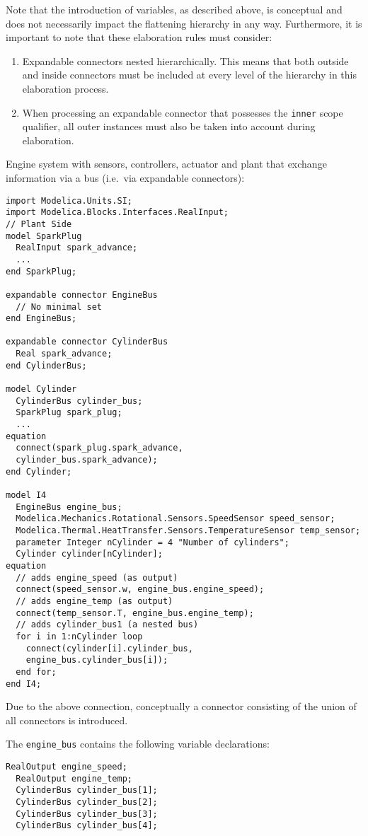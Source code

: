 \begin{nonnormative}
Note that the introduction of variables, as described above, is
conceptual and does not necessarily impact the flattening hierarchy in
any way. Furthermore, it is important to note that these elaboration
rules must consider:
\begin{enumerate}
\item Expandable connectors nested hierarchically. This means that
both outside and inside connectors must be included at every level of
the hierarchy in this elaboration process.
\item When processing an expandable connector that possesses the
\lstinline!inner! scope qualifier, all outer instances must also be taken into
account during elaboration.
\end{enumerate}
\end{nonnormative}

\begin{example}
Engine system with sensors, controllers, actuator and plant that
exchange information via a bus (i.e.\ via expandable connectors):
\begin{lstlisting}[language=modelica]
import Modelica.Units.SI;
import Modelica.Blocks.Interfaces.RealInput;
// Plant Side
model SparkPlug
  RealInput spark_advance;
  ...
end SparkPlug;

expandable connector EngineBus
  // No minimal set
end EngineBus;

expandable connector CylinderBus
  Real spark_advance;
end CylinderBus;

model Cylinder
  CylinderBus cylinder_bus;
  SparkPlug spark_plug;
  ...
equation
  connect(spark_plug.spark_advance,
  cylinder_bus.spark_advance);
end Cylinder;

model I4
  EngineBus engine_bus;
  Modelica.Mechanics.Rotational.Sensors.SpeedSensor speed_sensor;
  Modelica.Thermal.HeatTransfer.Sensors.TemperatureSensor temp_sensor;
  parameter Integer nCylinder = 4 "Number of cylinders";
  Cylinder cylinder[nCylinder];
equation
  // adds engine_speed (as output)
  connect(speed_sensor.w, engine_bus.engine_speed);
  // adds engine_temp (as output)
  connect(temp_sensor.T, engine_bus.engine_temp);
  // adds cylinder_bus1 (a nested bus)
  for i in 1:nCylinder loop
    connect(cylinder[i].cylinder_bus,
    engine_bus.cylinder_bus[i]);
  end for;
end I4;
\end{lstlisting}
Due to the above connection, conceptually a connector consisting
of the union of all connectors is introduced.

The \lstinline!engine_bus! contains the following variable declarations:
\begin{lstlisting}[language=modelica]
  RealOutput engine_speed;
  RealOutput engine_temp;
  CylinderBus cylinder_bus[1];
  CylinderBus cylinder_bus[2];
  CylinderBus cylinder_bus[3];
  CylinderBus cylinder_bus[4];
\end{lstlisting}
\end{example}

